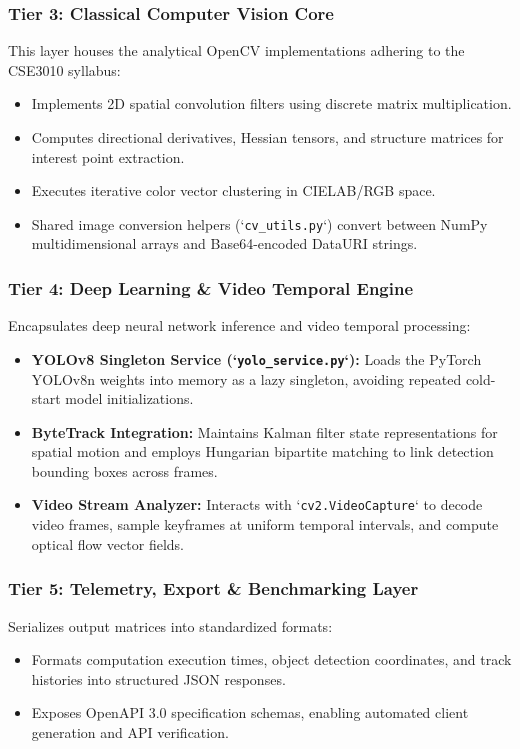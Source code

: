 \subsubsection{Tier 3: Classical Computer Vision Core}
This layer houses the analytical OpenCV implementations adhering to the CSE3010 syllabus:
\begin{itemize}
    \item Implements 2D spatial convolution filters using discrete matrix multiplication.
    \item Computes directional derivatives, Hessian tensors, and structure matrices for interest point extraction.
    \item Executes iterative color vector clustering in CIELAB/RGB space.
    \item Shared image conversion helpers (`\texttt{cv\_utils.py}`) convert between NumPy multidimensional arrays and Base64-encoded DataURI strings.
\end{itemize}

\subsubsection{Tier 4: Deep Learning \& Video Temporal Engine}
Encapsulates deep neural network inference and video temporal processing:
\begin{itemize}
    \item \textbf{YOLOv8 Singleton Service (`\texttt{yolo\_service.py}`):} Loads the PyTorch YOLOv8n weights into memory as a lazy singleton, avoiding repeated cold-start model initializations.
    \item \textbf{ByteTrack Integration:} Maintains Kalman filter state representations for spatial motion and employs Hungarian bipartite matching to link detection bounding boxes across frames.
    \item \textbf{Video Stream Analyzer:} Interacts with `\texttt{cv2.VideoCapture}` to decode video frames, sample keyframes at uniform temporal intervals, and compute optical flow vector fields.
\end{itemize}

\subsubsection{Tier 5: Telemetry, Export \& Benchmarking Layer}
Serializes output matrices into standardized formats:
\begin{itemize}
    \item Formats computation execution times, object detection coordinates, and track histories into structured JSON responses.
    \item Exposes OpenAPI 3.0 specification schemas, enabling automated client generation and API verification.
\end{itemize}
